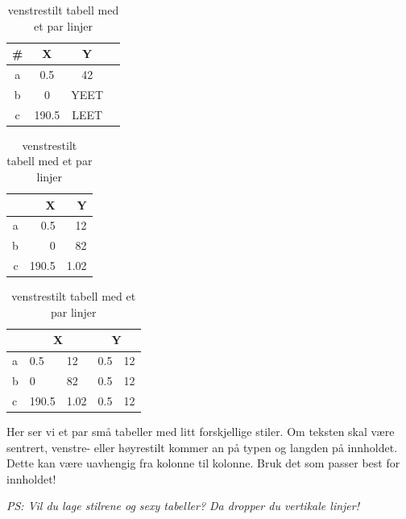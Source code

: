     
    \begin{table}[H]
            \centering
            \caption{sentrert tekst med kanter og linjer}
            \label{tab:center-tabell}
            \begin{tabular}{|c|c|c|c|}
                \hline
                \textbf{\#}  & \textbf{X}     & \textbf{Y}     \\\hline
                a   & 0.5   & 42    \\\hline
                b   & 0     & YEET  \\\hline
                c   & 190.5 & LEET  \\\hline
            \end{tabular}
        \endminipage\hfill
            \centering
            \caption{høyrestilt tekst uten kanter, en linje}
            \label{tab:høyre-tabell}
            \begin{tabular}{rrr}
                    & X     & Y     \\\hline
                a   & 0.5   & 12    \\
                b   & 0     & 82    \\
                c   & 190.5 & 1.02  
            \end{tabular}
        \endminipage\hfill
            \centering
            \caption{venstrestilt tabell med et par linjer}
            \label{tab:venstre-tabell}
            \begin{tabular}{l|llll}
                    & \multicolumn{2}{c}{X} & \multicolumn{2}{c}{Y}     \\\hline
                a   & 0.5   & 12 & 0.5   & 12   \\
                b   & 0     & 82 & 0.5   & 12   \\
                c   & 190.5 & 1.02  & 0.5   & 12
            \end{tabular}
        \endminipage\hfill
    \end{table}

    Her ser vi et par små tabeller med litt forskjellige stiler. Om teksten skal være sentrert, venstre- eller høyrestilt kommer an på typen og langden på innholdet. Dette kan være uavhengig fra kolonne til kolonne. Bruk det som passer best for innholdet!
    
    \textit{PS: Vil du lage stilrene og sexy tabeller? Da dropper du vertikale linjer!}

